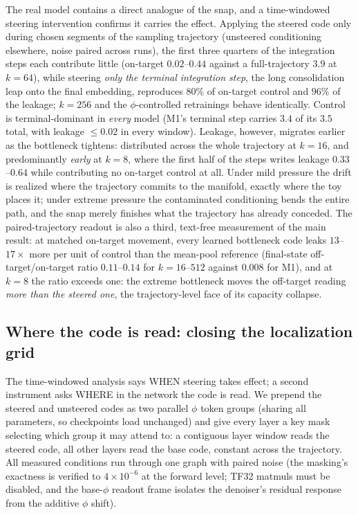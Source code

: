 \documentclass[11pt]{article}
\begin{document}
The real model contains a direct analogue of the snap, and a time-windowed
steering intervention confirms it carries the effect. Applying the steered
code only during chosen segments of the sampling trajectory (unsteered
conditioning elsewhere, noise paired across runs), the first three quarters of
the integration steps each contribute little (on-target $0.02$--$0.44$ against
a full-trajectory $3.9$ at $k{=}64$), while steering \emph{only the terminal
integration step}, the long consolidation leap onto the final embedding,
reproduces $80\%$ of on-target control and $96\%$ of the leakage; $k{=}256$
and the $\phi$-controlled retrainings behave identically. Control is
terminal-dominant in \emph{every} model (M1's terminal step carries
$3.4$ of its $3.5$ total, with leakage ${\le}0.02$ in every window). Leakage,
however, migrates earlier as the bottleneck tightens: distributed across the
whole trajectory at $k{=}16$, and predominantly \emph{early} at $k{=}8$, where
the first half of the steps writes leakage $0.33$--$0.64$ while contributing
no on-target control at all. Under mild pressure the drift is realized where
the trajectory commits to the manifold, exactly where the toy places it; under
extreme pressure the contaminated conditioning bends the entire path, and the
snap merely finishes what the trajectory has already conceded. The paired-trajectory readout is also a third, text-free measurement of
the main result: at matched on-target movement, every learned bottleneck code
leaks $13$--$17\times$ more per unit of control than the mean-pool reference
(final-state off-target/on-target ratio $0.11$--$0.14$ for $k{=}16$--$512$
against $0.008$ for M1), and at $k{=}8$ the ratio exceeds one: the extreme
bottleneck moves the off-target reading \emph{more than the steered one}, the
trajectory-level face of its capacity collapse.

\subsection{Where the code is read: closing the localization grid}
\label{sec:depth}
The time-windowed analysis says WHEN steering takes effect; a second
instrument asks WHERE in the network the code is read. We prepend the
steered and unsteered codes as two parallel $\phi$ token groups (sharing all
parameters, so checkpoints load unchanged) and give every layer a key mask
selecting which group it may attend to: a contiguous layer window reads the
steered code, all other layers read the base code, constant across the
trajectory. All measured conditions run through one graph with paired noise
(the masking's exactness is verified to $4{\times}10^{-6}$ at the forward
level; TF32 matmuls must be disabled, and the base-$\phi$ readout frame
isolates the denoiser's residual response from the additive $\phi$ shift).
\end{document}
